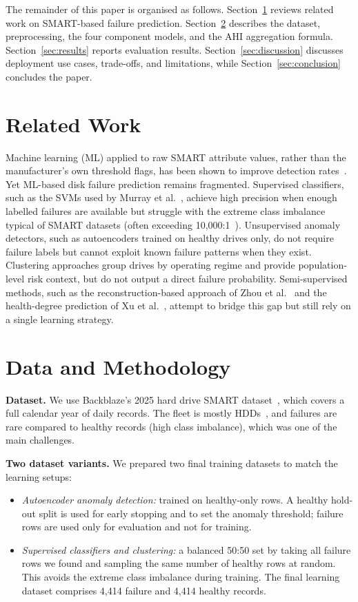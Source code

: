 \documentclass[sigconf,natbib=false]{acmart}
\begin{document}
The remainder of this paper is organised as follows. Section~\ref{sec:related} reviews related work on SMART-based failure prediction. Section~\ref{sec:method} describes the dataset, preprocessing, the four component models, and the AHI aggregation formula. Section~\ref{sec:results} reports evaluation results. Section~\ref{sec:discussion} discusses deployment use cases, trade-offs, and limitations, while Section~\ref{sec:conclusion} concludes the paper.

\section{Related Work}
\label{sec:related}

Machine learning (ML) applied to raw SMART attribute values, rather than the manufacturer's own threshold flags, has been shown to improve detection rates~\cite{murray2005,lu2020smarter}. Yet ML-based disk failure prediction remains fragmented. Supervised classifiers, such as the SVMs used by Murray et al.~\cite{murray2005}, achieve high precision when enough labelled failures are available but struggle with the extreme class imbalance typical of SMART datasets (often exceeding 10{,}000:1~\cite{ahmed2024costaware}). Unsupervised anomaly detectors, such as autoencoders trained on healthy drives only, do not require failure labels but cannot exploit known failure patterns when they exist. Clustering approaches group drives by operating regime and provide population-level risk context, but do not output a direct failure probability. Semi-supervised methods, such as the reconstruction-based approach of Zhou et al.~\cite{zhou2024proactive} and the health-degree prediction of Xu et al.~\cite{xu2018layerwise}, attempt to bridge this gap but still rely on a single learning strategy.

\section{Data and Methodology}
\label{sec:method}

\textbf{Dataset.} We use Backblaze's 2025 hard drive SMART dataset~\cite{backblaze2025}, which covers a full calendar year of daily records. The fleet is mostly HDDs~\cite{backblaze2025stats}, and failures are rare compared to healthy records (high class imbalance), which was one of the main challenges.

\textbf{Two dataset variants.} We prepared two final training datasets to match the learning setups:
\begin{itemize}
    \item \emph{Autoencoder anomaly detection:} trained on healthy-only rows. A healthy hold-out split is used for early stopping and to set the anomaly threshold; failure rows are used only for evaluation and not for training.
    \item \emph{Supervised classifiers and clustering:} a balanced 50:50 set by taking all failure rows we found and sampling the same number of healthy rows at random. This avoids the extreme class imbalance during training. The final learning dataset comprises 4{,}414 failure and 4{,}414 healthy records.
\end{itemize}
\end{document}
